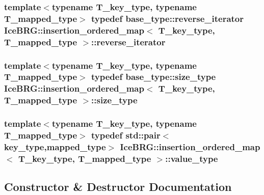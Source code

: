 \subsubsection[{reverse\+\_\+iterator}]{\setlength{\rightskip}{0pt plus 5cm}template$<$typename T\+\_\+key\+\_\+type, typename T\+\_\+mapped\+\_\+type$>$ typedef base\+\_\+type\+::reverse\+\_\+iterator {\bf Ice\+B\+R\+G\+::insertion\+\_\+ordered\+\_\+map}$<$ T\+\_\+key\+\_\+type, T\+\_\+mapped\+\_\+type $>$\+::{\bf reverse\+\_\+iterator}}\label{classIceBRG_1_1insertion__ordered__map_ae040bd2bd5e69ae6288849f97d666a24}
\hypertarget{classIceBRG_1_1insertion__ordered__map_a1572dc5358a75c3908382208e74af12d}{}
\subsubsection[{size\+\_\+type}]{\setlength{\rightskip}{0pt plus 5cm}template$<$typename T\+\_\+key\+\_\+type, typename T\+\_\+mapped\+\_\+type$>$ typedef base\+\_\+type\+::size\+\_\+type {\bf Ice\+B\+R\+G\+::insertion\+\_\+ordered\+\_\+map}$<$ T\+\_\+key\+\_\+type, T\+\_\+mapped\+\_\+type $>$\+::{\bf size\+\_\+type}}\label{classIceBRG_1_1insertion__ordered__map_a1572dc5358a75c3908382208e74af12d}
\hypertarget{classIceBRG_1_1insertion__ordered__map_a3d6c2c7983b7feaab115020ca240d73c}{}
\subsubsection[{value\+\_\+type}]{\setlength{\rightskip}{0pt plus 5cm}template$<$typename T\+\_\+key\+\_\+type, typename T\+\_\+mapped\+\_\+type$>$ typedef std\+::pair$<${\bf key\+\_\+type},{\bf mapped\+\_\+type}$>$ {\bf Ice\+B\+R\+G\+::insertion\+\_\+ordered\+\_\+map}$<$ T\+\_\+key\+\_\+type, T\+\_\+mapped\+\_\+type $>$\+::{\bf value\+\_\+type}}\label{classIceBRG_1_1insertion__ordered__map_a3d6c2c7983b7feaab115020ca240d73c}


\subsection{Constructor \& Destructor Documentation}
\hypertarget{classIceBRG_1_1insertion__ordered__map_a25ef7dfc57b16788fefef374b5bfbe0f}{}
